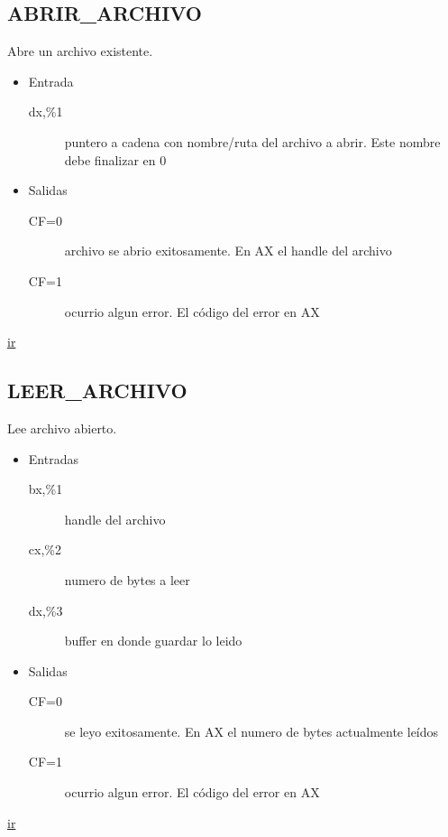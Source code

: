 \subsection{ABRIR\_ARCHIVO}
\label{sec-1-4}
Abre un archivo existente.
\begin{itemize}
\item Entrada
\begin{description}
\item[dx,\%1] puntero a cadena con nombre/ruta del archivo a
abrir. Este nombre debe finalizar en 0
\end{description}
\item Salidas
\begin{description}
\item[CF=0] archivo se abrio exitosamente. En AX el handle
del archivo
\item[CF=1] ocurrio algun error. El código del error en AX
\end{description}
\end{itemize}
\href{http://www.ctyme.com/intr/rb-2779.htm}{ir}

\subsection{LEER\_ARCHIVO}
\label{sec-1-5}
Lee archivo abierto.
\begin{itemize}
\item Entradas
\begin{description}
\item[bx,\%1] handle del archivo
\item[cx,\%2] numero de bytes a leer
\item[dx,\%3] buffer en donde guardar lo leido
\end{description}
\item Salidas
\begin{description}
\item[CF=0] se leyo exitosamente. En AX el numero de bytes
actualmente leídos
\item[CF=1] ocurrio algun error. El código del error en AX
\end{description}
\end{itemize}
\href{http://www.ctyme.com/intr/rb-2783.htm}{ir}



